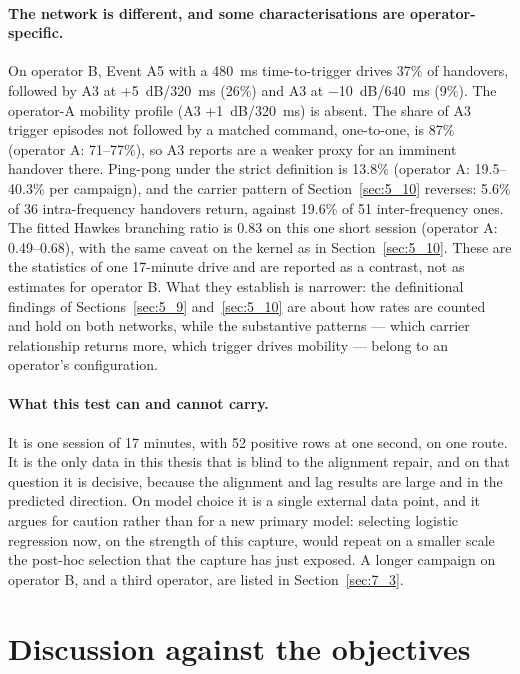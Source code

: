 \paragraph{The network is different, and some characterisations are operator-specific.} On operator B, Event A5 with a 480~ms time-to-trigger drives 37\% of handovers, followed by A3 at +5~dB/320~ms (26\%) and A3 at $-$10~dB/640~ms (9\%). The operator-A mobility profile (A3 +1~dB/320~ms) is absent. The share of A3 trigger episodes not followed by a matched command, one-to-one, is 87\% (operator A: 71--77\%), so A3 reports are a weaker proxy for an imminent handover there. Ping-pong under the strict definition is 13.8\% (operator A: 19.5--40.3\% per campaign), and the carrier pattern of Section~\ref{sec:5_10} reverses: 5.6\% of 36 intra-frequency handovers return, against 19.6\% of 51 inter-frequency ones. The fitted Hawkes branching ratio is 0.83 on this one short session (operator A: 0.49--0.68), with the same caveat on the kernel as in Section~\ref{sec:5_10}. These are the statistics of one 17-minute drive and are reported as a contrast, not as estimates for operator B. What they establish is narrower: the definitional findings of Sections~\ref{sec:5_9} and~\ref{sec:5_10} are about how rates are counted and hold on both networks, while the substantive patterns --- which carrier relationship returns more, which trigger drives mobility --- belong to an operator's configuration.

\paragraph{What this test can and cannot carry.} It is one session of 17 minutes, with 52 positive rows at one second, on one route. It is the only data in this thesis that is blind to the alignment repair, and on that question it is decisive, because the alignment and lag results are large and in the predicted direction. On model choice it is a single external data point, and it argues for caution rather than for a new primary model: selecting logistic regression now, on the strength of this capture, would repeat on a smaller scale the post-hoc selection that the capture has just exposed. A longer campaign on operator B, and a third operator, are listed in Section~\ref{sec:7_3}.


\section{Discussion against the objectives}
\label{sec:5_13}

